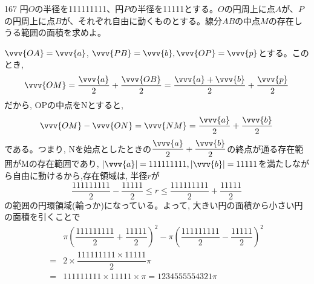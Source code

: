 \begin{prob}{167}{}{}
 円$O$の半径を111111111、円$P$の半径を11111とする。$O$の円周上に点$A$が、$P$の円周上に点$B$が、それぞれ自由に動くものとする。線分$AB$の中点$M$の存在しうる範囲の面積を求めよ。 
\end{prob}
$\vvv{OA}=\vvv{a}$, $\vvv{PB}=\vvv{b}, \vvv{OP}=\vvv{p}$とする。このとき,
\[\vvv{OM}=\dfrac{\vvv{a}}{2}+\dfrac{\vvv{OB}}{2}=\dfrac{\vvv{a}+\vvv{b}}{2}+\dfrac{\vvv{p}}{2}\]
だから, OPの中点をNとすると, 
\[\vvv{OM}-\vvv{ON}=\vvv{NM}=\dfrac{\vvv{a}}{2}+\dfrac{\vvv{b}}{2}\]
である。つまり, Nを始点としたときの$\dfrac{\vvv{a}}{2}+\dfrac{\vvv{b}}{2}$の終点が通る存在範囲がMの存在範囲であり, $|\vvv{a}|=111111111, |\vvv{b}|=11111$を満たしながら自由に動けるから,存在領域は, 半径$r$が
\[\dfrac{111111111}{2}-\dfrac{11111}{2}\leq r\leq \dfrac{111111111}{2}+\dfrac{11111}{2}\]
の範囲の円環領域(輪っか)になっている。よって, 大きい円の面積から小さい円の面積を引くことで
\begin{align*}
&\pi\left(\dfrac{111111111}{2}+\dfrac{11111}{2}\right)^2 -\pi\left(\dfrac{111111111}{2}-\dfrac{11111}{2}\right)^2\\
=&2\times \dfrac{111111111\times 11111}{2} \pi\\
=& 111111111\times 11111\times \pi=1234555554321\pi
\end{align*}